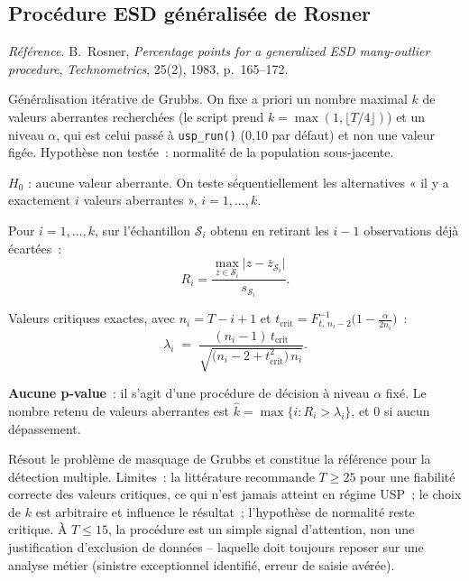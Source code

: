 \documentclass[a4paper,11pt]{article}
\newcommand{\code}[1]{\texttt{\small #1}}
\newcommand{\refl}[1]{{\small\textcolor{maincolor!70!black}{\textit{Référence.} #1}}\par\smallskip}
\newcounter{ficheid}
\newenvironment{fiche}[1]{%
  \stepcounter{ficheid}%
  \phantomsection
  \subsection{#1}%
  \label{fiche:\theficheid}%
}{%
  \end{description}\vspace{0.5em}%
}
\newcommand{\Cadre}{%
  \begin{description}[leftmargin=0pt, style=unboxed, itemsep=3pt, topsep=3pt, parsep=2pt]%
  \item[\textcolor{financeblue}{\textbf{1. Cadre, notations et hypothèses de validité (non testées).}}]}
\newcommand{\Hzero}{\item[\textcolor{financeblue}{\textbf{2. Hypothèse nulle.}}]}
\newcommand{\Stat}{\item[\textcolor{financeblue}{\textbf{3. Statistique de test.}}]}
\newcommand{\Loi}{\item[\textcolor{financeblue}{\textbf{4. Loi sous $H_0$.}}]}
\newcommand{\Pval}{\item[\textcolor{financeblue}{\textbf{5. p-value.}}]}
\newcommand{\Usage}{\item[\textcolor{financeblue}{\textbf{6. Usage et limites.}}]}
\begin{document}
\begin{fiche}{Procédure ESD généralisée de Rosner}
\refl{B.~Rosner, \emph{Percentage points for a generalized ESD many-outlier procedure},
\emph{Technometrics}, 25(2), 1983, p.~165--172.}
\Cadre
Généralisation itérative de Grubbs. On fixe a priori un nombre maximal $k$ de valeurs aberrantes
recherchées (le script prend $k = \max(1, \lfloor T/4 \rfloor)$) et un niveau $\alpha$, qui est
celui passé à \code{usp\_run()} (0,10 par défaut) et non une valeur figée. Hypothèse non
testée~: normalité de la population sous-jacente.
\Hzero
$H_0$ : aucune valeur aberrante. On teste séquentiellement les alternatives « il y a exactement
$i$ valeurs aberrantes », $i=1,\dots,k$.
\Stat
Pour $i = 1,\dots,k$, sur l'échantillon $\mathcal{S}_i$ obtenu en retirant les $i-1$ observations
déjà écartées~:
\[
  R_i = \frac{\max_{z\in\mathcal{S}_i}\big|z - \bar z_{\mathcal{S}_i}\big|}{s_{\mathcal{S}_i}} .
\]
\Loi
Valeurs critiques exactes, avec $n_i = T-i+1$ et
$t_{\text{crit}} = F^{-1}_{t,\,n_i-2}\big(1 - \tfrac{\alpha}{2 n_i}\big)$~:
\[
  \lambda_i \;=\; \frac{(n_i - 1)\, t_{\text{crit}}}{\sqrt{\big(n_i - 2 + t_{\text{crit}}^2\big)\, n_i}} .
\]
\Pval
\textbf{Aucune p-value}~: il s'agit d'une procédure de décision à niveau $\alpha$ fixé. Le nombre
retenu de valeurs aberrantes est $\hat k = \max\{i : R_i > \lambda_i\}$, et $0$ si aucun
dépassement.
\Usage
Résout le problème de masquage de Grubbs et constitue la référence pour la détection multiple.
Limites~: la littérature recommande $T \ge 25$ pour une fiabilité correcte des valeurs critiques,
ce qui n'est jamais atteint en régime USP~; le choix de $k$ est arbitraire et influence le
résultat~; l'hypothèse de normalité reste critique. À $T \le 15$, la procédure est un simple
signal d'attention, non une justification d'exclusion de données -- laquelle doit toujours reposer
sur une analyse métier (sinistre exceptionnel identifié, erreur de saisie avérée).
\end{fiche}
\end{document}
